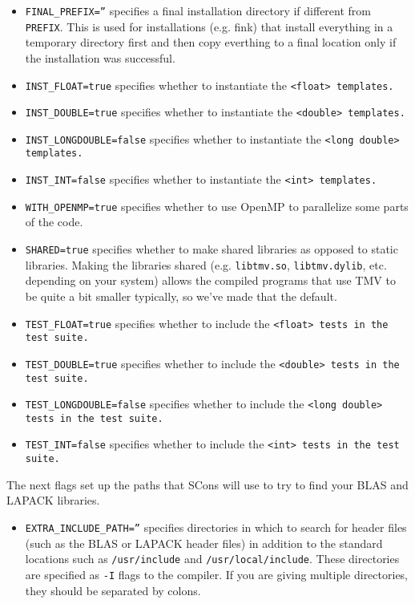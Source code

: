 \begin{enumerate}
\begin{itemize}
\item \texttt{FINAL\_PREFIX=''} specifies a final installation directory if different from \texttt{PREFIX}.  This is used for installations (e.g. fink) that install everything in a temporary directory first and then copy everthing to a final location only if the installation was successful.
\item \texttt{INST\_FLOAT=true} specifies whether to instantiate the \tt{<float>} templates.
\item \texttt{INST\_DOUBLE=true} specifies whether to instantiate the \tt{<double>} templates.
\item \texttt{INST\_LONGDOUBLE=false} specifies whether to instantiate the \tt{<long double>} templates.
\item \texttt{INST\_INT=false} specifies whether to instantiate the \tt{<int>} templates.
\item \texttt{WITH\_OPENMP=true} specifies whether to use OpenMP to parallelize some parts of the code.
\item \texttt{SHARED=true} specifies whether to make shared libraries as opposed to static libraries.  Making the libraries shared (e.g. \texttt{libtmv.so}, \texttt{libtmv.dylib}, etc. depending on your system) allows the compiled programs that use TMV to be quite a bit smaller typically, so we've made that the default.
\item \texttt{TEST\_FLOAT=true} specifies whether to include the \tt{<float>} tests in the test suite.
\item \texttt{TEST\_DOUBLE=true} specifies whether to include the \tt{<double>} tests in the test suite.
\item \texttt{TEST\_LONGDOUBLE=false} specifies whether to include the \tt{<long double>} tests in the test suite.
\item \texttt{TEST\_INT=false} specifies whether to include the \tt{<int>} tests in the test suite.
\end{itemize}
The next flags set up the paths that SCons will use to try to find your BLAS and LAPACK libraries.
\begin{itemize}
\item \texttt{EXTRA\_INCLUDE\_PATH=''} specifies directories in which to search for header files
(such as the BLAS or LAPACK header files)
in addition to the standard locations such as \texttt{/usr/include} and \texttt{/usr/local/include}.
These directories are specified as \texttt{-I} flags to the compiler.
If you are giving multiple directories, they should be separated by colons.

\end{itemize}
\end{enumerate}
